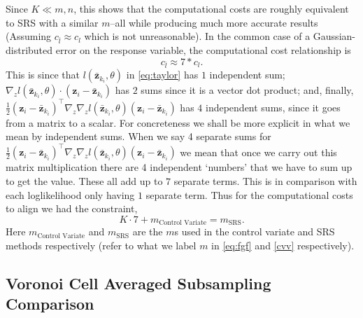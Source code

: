 Since $K \ll m,n$, this shows that the computational costs are roughly equivalent to SRS with a similar $m$--all while producing much more accurate results (Assuming $c_{\bar{l}} \approx c_{l}$ which is not unreasonable). In the common case of a Gaussian-distributed error on the response variable, the computational cost relationship is 
%
\begin{equation}
    c_{\bar{l}} \approx 7*c_{l}.
\end{equation}
%
This is since that $l(\bar{\textbf{z}}_{k_{i}},\theta)$ in \cref{eq:taylor} has $1$ independent sum; $\nabla_z l(\bar{\textbf{z}}_{k_{i}},\theta) \cdot (\textbf{z}_i-\bar{\textbf{z}}_{k_{i}})$ has $2$ sums since it is a vector dot product; and, finally, $\frac{1}{2}(\textbf{z}_i-\bar{\textbf{z}}_{k_{i}})^\intercal  \nabla_z \nabla_z l(\bar{\textbf{z}}_{k_{i}},\theta)(\textbf{z}_i-\bar{\textbf{z}}_{k_{i}})$ has $4$ independent sums, since it goes from a matrix to a scalar. For concreteness we shall be more explicit in what we mean by independent sums. When we say 4 separate sums for $\frac{1}{2}(\textbf{z}_i-\bar{\textbf{z}}_{k_{i}})^\intercal  \nabla_z \nabla_z l(\bar{\textbf{z}}_{k_{i}},\theta)(\textbf{z}_i-\bar{\textbf{z}}_{k_{i}})$ we mean that once we carry out this matrix multiplication there are 4 independent `numbers' that we have to sum up to get the value. These all add up to $7$ separate terms. This is in comparison with each loglikelihood only having $1$ separate term. Thus for the computational costs to align we had the constraint,
%
\begin{equation}
    K \cdot 7 + m_{\textrm{Control Variate}}= m_{\textrm{SRS}}.
\end{equation}
%
Here $m_{\textrm{Control Variate}}$ and $m_{\textrm{SRS}}$ are the $m$s used in the control variate and SRS methods respectively (refer to what we label $m$ in \cref{eq:fgf} and \cref{cvv} respectively). 



\subsection{Voronoi Cell Averaged Subsampling Comparison}\label{sec:voronoi}


